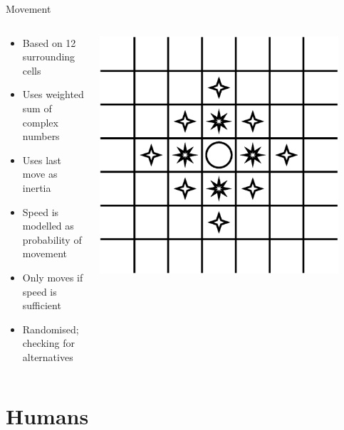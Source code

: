 \documentclass{beamer}
\begin{document}
\begin{frame}{Movement}
    \begin{columns}
        \begin{column}{.5\textwidth}
            \begin{itemize}
                \item Based on 12 surrounding cells
                \item Uses weighted sum of complex numbers
                \item Uses last move as inertia
                \item Speed is modelled as probability of movement
                \item Only moves if speed is sufficient
                \item Randomised; checking for alternatives
            \end{itemize}
        \end{column}
        \begin{column}{.5\textwidth}
            \includegraphics[width=0.9\textwidth]{movement}
        \end{column}
    \end{columns}
\end{frame}

\section{Humans}
\end{document}

